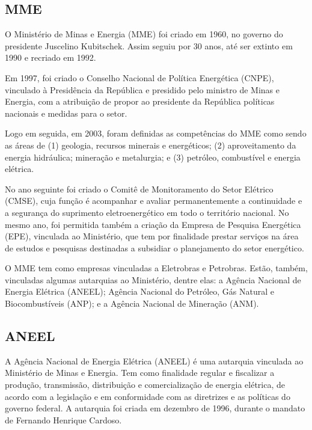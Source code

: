 \documentclass[grad,numbers]{coppe}
\begin{document}
  \hypertarget{mme}{%
  \subsection{MME}\label{mme}}

  O Ministério de Minas e Energia (MME) foi criado em 1960, no governo do presidente Juscelino Kubitschek. Assim seguiu por 30 anos, até ser extinto em 1990 e recriado em 1992.

  Em 1997, foi criado o Conselho Nacional de Política Energética (CNPE), vinculado à Presidência da República e presidido pelo ministro de Minas e Energia, com a atribuição de propor ao presidente da República políticas nacionais e medidas para o setor.

  Logo em seguida, em 2003, foram definidas as competências do MME como sendo as áreas de (1) geologia, recursos minerais e energéticos; (2) aproveitamento da energia hidráulica; mineração e metalurgia; e (3) petróleo, combustível e energia elétrica.

  No ano seguinte foi criado o Comitê de Monitoramento do Setor Elétrico (CMSE), cuja função é acompanhar e avaliar permanentemente a continuidade e a segurança do suprimento eletroenergético em todo o território nacional. No mesmo ano, foi permitida também a criação da Empresa de Pesquisa Energética (EPE), vinculada ao Ministério, que tem por finalidade prestar serviços na área de estudos e pesquisas destinadas a subsidiar o planejamento do setor energético.

  O MME tem como empresas vinculadas a Eletrobras e Petrobras. Estão, também, vinculadas algumas autarquias ao Ministério, dentre elas: a Agência Nacional de Energia Elétrica (ANEEL); Agência Nacional do Petróleo, Gás Natural e Biocombustíveis (ANP); e a Agência Nacional de Mineração (ANM).

  \hypertarget{aneel}{%
  \subsection{ANEEL}\label{aneel}}

  A Agência Nacional de Energia Elétrica (ANEEL) é uma autarquia vinculada ao Ministério de Minas e Energia. Tem como finalidade regular e fiscalizar a produção, transmissão, distribuição e comercialização de energia elétrica, de acordo com a legislação e em conformidade com as diretrizes e as políticas do governo federal. A autarquia foi criada em dezembro de 1996, durante o mandato de Fernando Henrique Cardoso.
\end{document}
